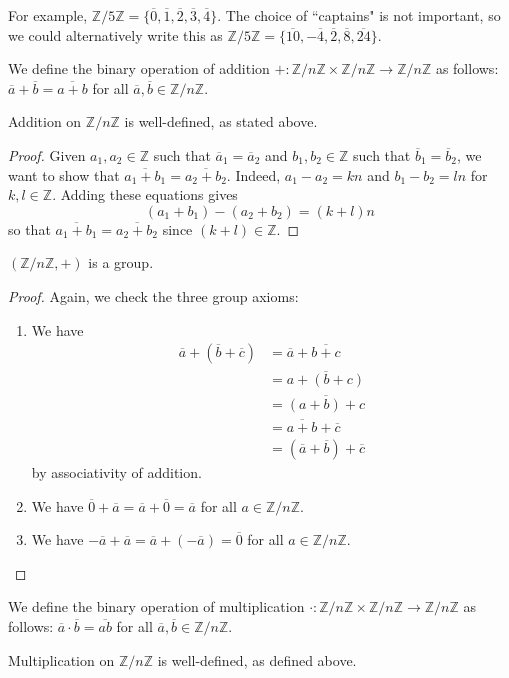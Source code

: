 \documentclass{article}
\theoremstyle{plain}
\newcommand{\Z}{\mathbb{Z}}
\newcommand{\ol}[1]{\overline{#1}}
\begin{document}
For example, $\Z/5\Z = \{\overline{0}, \overline{1}, \overline{2}, \overline{3}, \overline{4}\}$. The choice of ``captains" is not important, so we could alternatively write this as $\Z/5\Z = \{ \ol{10}, -\ol{4}, \ol{2}, \ol{8}, \ol{24} \}$.
\begin{definition}{}{}
We define the binary operation of addition $+: \Z/n\Z \times \Z/n\Z \rightarrow \Z/n\Z$ as follows: $\overline{a}+\overline{b} = \overline{a+b}$ for all $\overline{a}, \overline{b} \in \Z/n\Z$.
\end{definition}
\begin{lemma}{}{}
Addition on $\Z/n\Z$ is well-defined, as stated above.
\end{lemma}
\begin{proof}
Given $a_1,a_2 \in \Z$ such that $\overline{a}_1 = \overline{a}_2$ and $b_1,b_2 \in \Z$ such that $\overline{b}_1 = \overline{b}_2$, we want to show that $\overline{a_1+b_1} = \overline{a_2+b_2}$. Indeed, $a_1-a_2 = kn$ and $b_1-b_2 = ln$ for $k,l\in\Z$. Adding these equations gives $$(a_1+b_1) - (a_2+b_2) = (k+l)n$$ so that $\overline{a_1+b_1} = \overline{a_2+b_2}$ since $(k+l)\in\Z$.
\end{proof}
\begin{theorem}{}{}
$(\Z/n\Z, +)$ is a group.
\end{theorem}
\begin{proof}
Again, we check the three group axioms:
\begin{enumerate}[(1)]
\item We have 
\begin{align*}
\overline{a}+(\overline{b}+\overline{c}) &= \overline{a} + \overline{b+c} \\
&= \overline{a + (b+c)} \\
&= \overline{(a+b) +c} \\
&= \overline{a+b} + \overline{c} \\
&= (\overline{a} + \overline{b}) + \overline{c}
\end{align*}
by associativity of addition.
\item We have $\overline{0} + \overline{a} = \overline{a} + \overline{0} = \overline{a}$ for all $a \in \Z/n\Z$.
\item We have $-\overline{a} + \overline{a} = \overline{a} + (-\overline{a}) = \overline{0}$ for all $a \in \Z/n\Z$.
\end{enumerate}
\end{proof}
\begin{definition}{}{}
We define the binary operation of multiplication $\cdot: \Z/n\Z \times \Z/n\Z \rightarrow \Z/n\Z$ as follows: $\overline{a}\cdot \overline{b} = \overline{ab}$ for all $\overline{a}, \overline{b} \in \Z/n\Z$.
\end{definition}
\begin{theorem}{}{}
Multiplication on $\Z/n\Z$ is well-defined, as defined above.
\end{theorem}
\end{document}
